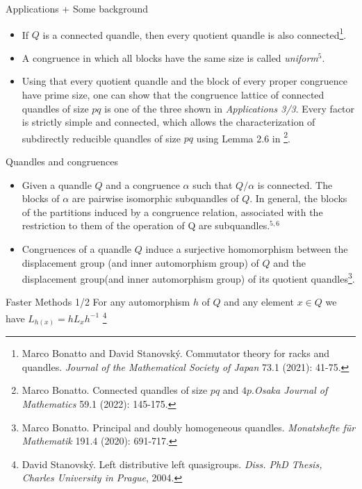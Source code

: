 \begin{frame}{Applications + Some background}
\normalsize
\begin{itemize}
    \item If $Q$ is a connected quandle, then every quotient quandle is also connected\footnote{Marco Bonatto and David Stanovský. Commutator theory for racks and quandles. \emph{Journal of the Mathematical Society of Japan} 73.1 (2021): 41-75.}.
\item A congruence in which all blocks have the same size is called \emph{uniform}$^{5}$.
\item Using that every quotient quandle and the block of every proper congruence have prime size, one can show that the congruence lattice of connected quandles of size $pq$ is one of the three shown in \emph{Applications 3/3}. Every factor is strictly simple and connected, which allows the characterization of subdirectly reducible quandles of size $pq$ using Lemma 2.6 in \footnote{Marco Bonatto. Connected quandles of size $pq$ and $4p$.\emph{Osaka Journal of Mathematics} 59.1 (2022): 145-175.}.
\end{itemize}
\end{frame}
\begin{frame}{Quandles and congruences}
\normalsize
\begin{itemize}
    
\item Given a quandle $Q$ and a congruence $\alpha$ such that $Q/\alpha$ is connected. The blocks of $\alpha$ are pairwise isomorphic subquandles of $Q$. In general, the blocks of the partitions induced by a congruence relation, associated with the restriction to them of the operation of Q are subquandles.$^{5,6}$
\item Congruences of a quandle $Q$ induce a surjective homomorphism between the displacement group (and inner automorphism group) of $Q$ and the displacement group(and inner automorphism group) of its quotient quandles\footnote{Marco Bonatto. Principal and doubly homogeneous quandles. \emph{Monatshefte für Mathematik} 191.4 (2020): 691-717.}.
\end{itemize}

\end{frame}

\begin{frame}{Faster Methods 1/2}
\normalsize
For any automorphism $h$ of $Q$ and any element $x\in Q$ we have $L_{h(x)} = hL_xh^{-1}$
\footnote{David Stanovský. Left distributive left quasigroups. \emph{Diss. PhD Thesis, Charles University in Prague}, 2004.}
    
\end{frame}

